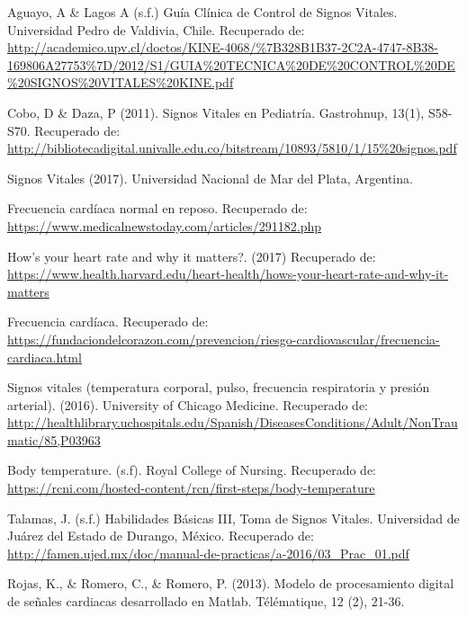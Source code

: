 \begin{thebibliography}{0}
	
	
	 Aguayo, A \& Lagos A (s.f.) Guía Clínica de Control de Signos Vitales. Universidad Pedro de Valdivia, Chile. Recuperado de: \url{http://academico.upv.cl/doctos/KINE-4068/\%7B328B1B37-2C2A-4747-8B38-169806A27753%7D/2012/S1/GUIA%20TECNICA%20DE%20CONTROL%20DE%20SIGNOS%20VITALES%20KINE.pdf}
	
	 Cobo, D \& Daza, P (2011). Signos Vitales en Pediatría. Gastrohnup, 13(1), S58-S70. Recuperado de: \url{http://bibliotecadigital.univalle.edu.co/bitstream/10893/5810/1/15%20signos.pdf} 
		
	 Signos Vitales (2017). Universidad Nacional de Mar del Plata, Argentina. 
		
	 Frecuencia cardíaca normal en reposo. Recuperado de: \url{https://www.medicalnewstoday.com/articles/291182.php}
	
	 How’s your heart rate and why it matters?. (2017) Recuperado de: \url{https://www.health.harvard.edu/heart-health/hows-your-heart-rate-and-why-it-matters}

	 Frecuencia cardíaca. Recuperado de: \url{https://fundaciondelcorazon.com/prevencion/riesgo-cardiovascular/frecuencia-cardiaca.html}

	
	
	 Signos vitales (temperatura corporal, pulso, frecuencia respiratoria y presión arterial). (2016). University of Chicago Medicine. Recuperado de: \url{http://healthlibrary.uchospitals.edu/Spanish/DiseasesConditions/Adult/NonTraumatic/85,P03963}
	
	 Body temperature. (s.f). Royal College of Nursing. Recuperado de: \url{https://rcni.com/hosted-content/rcn/first-steps/body-temperature}
	
	 Talamas, J. (s.f.) Habilidades Básicas III, Toma de Signos Vitales. Universidad de Juárez del Estado de Durango, México. Recuperado de: \url{http://famen.ujed.mx/doc/manual-de-practicas/a-2016/03_Prac_01.pdf}
	
	 Rojas, K., \& Romero, C., \& Romero, P. (2013). Modelo de procesamiento digital de señales cardiacas desarrollado en Matlab. Télématique, 12 (2), 21-36.
	

\end{thebibliography}

